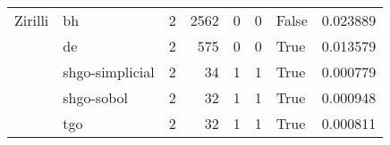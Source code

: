\begin{longtable}{llrrrrlr}
Zirilli & bh &     2 &     2562 &      0 &       0 &   False &    0.023889 \\
         & de &     2 &      575 &      0 &       0 &    True &    0.013579 \\
         & shgo-simplicial &     2 &       34 &      1 &       1 &    True &    0.000779 \\
         & shgo-sobol &     2 &       32 &      1 &       1 &    True &    0.000948 \\
         & tgo &     2 &       32 &      1 &       1 &    True &    0.000811 \\
\end{longtable}

